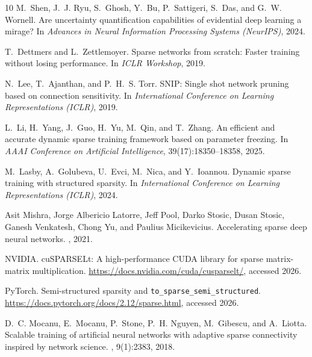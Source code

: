 \documentclass[letterpaper]{article}
\begin{document}
\begin{thebibliography}{10}
M.~Shen, J.~J. Ryu, S.~Ghosh, Y.~Bu, P.~Sattigeri, S.~Das, and G.~W. Wornell.
\newblock Are uncertainty quantification capabilities of evidential deep learning a mirage?
\newblock In {\em Advances in Neural Information Processing Systems (NeurIPS)}, 2024.

T.~Dettmers and L.~Zettlemoyer.
\newblock Sparse networks from scratch: Faster training without losing performance.
\newblock In {\em ICLR Workshop}, 2019.

N.~Lee, T.~Ajanthan, and P.~H.~S. Torr.
\newblock SNIP: Single shot network pruning based on connection sensitivity.
\newblock In {\em International Conference on Learning Representations (ICLR)}, 2019.

L.~Li, H.~Yang, J.~Guo, H.~Yu, M.~Qin, and T.~Zhang.
\newblock An efficient and accurate dynamic sparse training framework based on parameter freezing.
\newblock In {\em AAAI Conference on Artificial Intelligence}, 39(17):18350--18358, 2025.

M.~Lasby, A.~Golubeva, U.~Evci, M.~Nica, and Y.~Ioannou.
\newblock Dynamic sparse training with structured sparsity.
\newblock In {\em International Conference on Learning Representations (ICLR)}, 2024.

Asit Mishra, Jorge Albericio Latorre, Jeff Pool, Darko Stosic, Dusan Stosic, Ganesh Venkatesh, Chong Yu, and Paulius Micikevicius.
\newblock Accelerating sparse deep neural networks.
, 2021.

NVIDIA.
\newblock cuSPARSELt: A high-performance CUDA library for sparse matrix-matrix multiplication.
\newblock \url{https://docs.nvidia.com/cuda/cusparselt/}, accessed 2026.

PyTorch.
\newblock Semi-structured sparsity and \texttt{to\_sparse\_semi\_structured}.
\newblock \url{https://docs.pytorch.org/docs/2.12/sparse.html}, accessed 2026.

D.~C. Mocanu, E.~Mocanu, P.~Stone, P.~H. Nguyen, M.~Gibescu, and A.~Liotta.
\newblock Scalable training of artificial neural networks with adaptive sparse connectivity inspired by network science.
, 9(1):2383, 2018.



\end{thebibliography}
\end{document}
